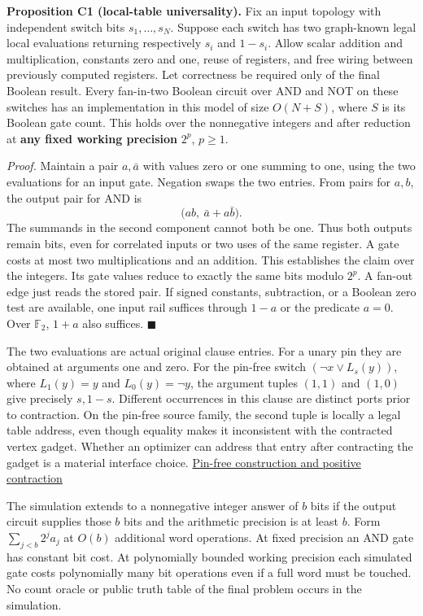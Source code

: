 \documentclass[
  11pt,
]{article}
\begin{document}
\textbf{Proposition C1 (local-table universality).} Fix an input
topology with independent switch bits \(s_1,\ldots,s_N\). Suppose each
switch has two graph-known legal local evaluations returning
respectively \(s_i\) and \(1-s_i\). Allow scalar addition and
multiplication, constants zero and one, reuse of registers, and free
wiring between previously computed registers. Let correctness be
required only of the final Boolean result. Every fan-in-two Boolean
circuit over AND and NOT on these switches has an implementation in this
model of size \(O(N+S)\), where \(S\) is its Boolean gate count. This
holds over the nonnegative integers and after reduction at \textbf{any
fixed working precision} \(2^p\), \(p\ge1\).

\emph{Proof.} Maintain a pair \(a,\bar a\) with values zero or one
summing to one, using the two evaluations for an input gate. Negation
swaps the two entries. From pairs for \(a,b\), the output pair for AND
is \[
       \bigl(ab,\ \bar a+a\bar b\bigr).
\] The summands in the second component cannot both be one. Thus both
outputs remain bits, even for correlated inputs or two uses of the same
register. A gate costs at most two multiplications and an addition. This
establishes the claim over the integers. Its gate values reduce to
exactly the same bits modulo \(2^p\). A fan-out edge just reads the
stored pair. If signed constants, subtraction, or a Boolean zero test
are available, one input rail suffices through \(1-a\) or the predicate
\(a=0\). Over \(\mathbb F_2\), \(1+a\) also suffices. \(\blacksquare\)

The two evaluations are actual original clause entries. For a unary pin
they are obtained at arguments one and zero. For the pin-free switch
\((\neg x\vee L_s(y))\), where \(L_1(y)=y\) and \(L_0(y)=\neg y\), the
argument tuples \((1,1)\) and \((1,0)\) give precisely \(s,1-s\).
Different occurrences in this clause are distinct ports prior to
contraction. On the pin-free source family, the second tuple is locally
a legal table address, even though equality makes it inconsistent with
the contracted vertex gadget. Whether an optimizer can address that
entry after contracting the gadget is a material interface choice.
\hyperref[v8-section-stronger-family]{Pin-free construction and positive
contraction}

The simulation extends to a nonnegative integer answer of \(b\) bits if
the output circuit supplies those \(b\) bits and the arithmetic
precision is at least \(b\). Form \(\sum_{j<b}2^j a_j\) at \(O(b)\)
additional word operations. At fixed precision an AND gate has constant
bit cost. At polynomially bounded working precision each simulated gate
costs polynomially many bit operations even if a full word must be
touched. No count oracle or public truth table of the final problem
occurs in the simulation.
\end{document}
